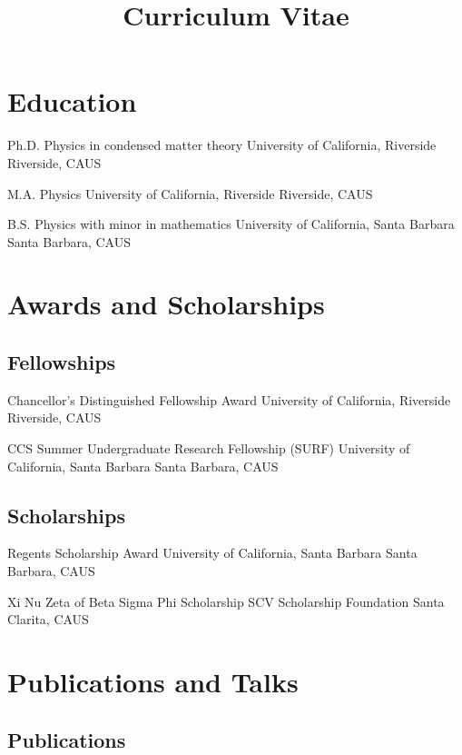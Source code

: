 \documentclass[10pt,letter]{moderncv}
\title{Curriculum Vitae}
\begin{document}
  \maketitle

  \section{Education}

    {Ph.D. Physics in condensed matter theory}
    {University of California, Riverside}
    {Riverside, CA}{US}{}

    {M.A. Physics}
    {University of California, Riverside}
    {Riverside, CA}{US}{}

    {B.S. Physics with minor in mathematics}
    {University of California, Santa Barbara}
    {Santa Barbara, CA}{US}{}

  \section{Awards and Scholarships}

  \subsection{Fellowships}

    {Chancellor's Distinguished Fellowship Award}
    {University of California, Riverside}
    {Riverside, CA}{US}{}

    {CCS Summer Undergraduate Research Fellowship (SURF)}
    {University of California, Santa Barbara}
    {Santa Barbara, CA}{US}{}

  \subsection{Scholarships}

    {Regents Scholarship Award}
    {University of California, Santa Barbara}
    {Santa Barbara, CA}{US}{}

    {Xi Nu Zeta of Beta Sigma Phi Scholarship}
    {SCV Scholarship Foundation}
    {Santa Clarita, CA}{US}{}

  \section{Publications and Talks}

  \subsection{Publications}
\end{document}

